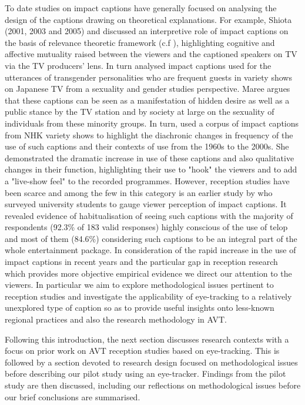 \documentclass[output=paper]{langsci/langscibook}
\begin{document}
To date studies on impact captions have generally focused on analysing the design of the captions drawing on theoretical explanations. For example, Shiota (2001, 2003 and 2005) and \citet{Sasamoto2014} discussed an interpretive role of impact captions on the basis of relevance theoretic framework (c.f \citet{Sperber1986second}), highlighting cognitive and affective mutuality raised between the viewers and the captioned speakers on TV via the TV producers' lens. In turn \citet{Maree2014} analysed impact captions used for the utterances of transgender personalities who are frequent guests in variety shows on Japanese TV from a sexuality and gender studies perspective. Maree argues that these captions can be seen as a manifestation of hidden desire as well as a public stance by the TV station and by society at large on the sexuality of individuals from these minority groups. In turn, \citet{Shitara2012} used a corpus of impact captions from NHK variety shows to highlight the diachronic changes in frequency of the use of such captions and their contexts of use from the 1960s to the 2000s. She demonstrated the dramatic increase in use of these captions and also qualitative changes in their function, highlighting their use to "hook" the viewers and to add a "live-show feel" to the recorded programmes. However, reception studies have been scarce and among the few in this category is an earlier study by \citet{Kimura2000} who surveyed university students to gauge viewer perception of impact captions. It revealed evidence of habitualisation of seeing such captions with the majority of respondents (92.3\% of 183 valid responses) highly conscious of the use of telop and most of them (84.6\%) considering such captions to be an integral part of the whole entertainment package. In consideration of the rapid increase in the use of impact captions in recent years \citep[p. 50]{Kato2012} and the particular gap in reception research which provides more objective empirical evidence we direct our attention to the viewers. In particular we aim to explore methodological issues pertinent to reception studies and investigate the applicability of eye-tracking to a relatively unexplored type of caption so as to provide useful insights onto less-known regional practices and also the research methodology in AVT.  



Following this introduction, the next section discusses research contexts with a focus on prior work on AVT reception studies based on eye-tracking. This is followed by a section devoted to research design focused on methodological issues before describing our pilot study using an eye-tracker. Findings from the pilot study are then discussed, including our reflections on methodological issues before our brief conclusions are summarised. 
\end{document}
